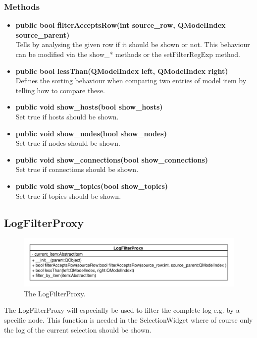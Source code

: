 \subsubsection{Methods}
\begin{itemize}
  \item \textbf{public bool filterAcceptsRow(int source\_row, QModelIndex
  source\_parent)}\\
  Tells by analysing the given row if it should be shown or not. This behaviour can be modified via the show\_* methods or the setFilterRegExp method.
  \item \textbf{public bool lessThan(QModelIndex left, QModelIndex right)}\\
  Defines the sorting behaviour when comparing two entries of model item by telling how to compare these.
  \item \textbf{public void show\_hosts(bool show\_hosts)}\\
  Set true if hosts should be shown.
  \item \textbf{public void show\_nodes(bool show\_nodes)}\\
  Set true if nodes should be shown.
  \item \textbf{public void show\_connections(bool show\_connections)}\\
  Set true if connections should be shown.
  \item \textbf{public void show\_topics(bool show\_topics)}\\
  Set true if topics should be shown.
\end{itemize}

\subsection{LogFilterProxy}
\begin{figure}[htbp]
	\begin{minipage}[t]{7cm}
		\vspace{0pt}
		\centering
		\includegraphics[scale=0.6]{./diagram_pictures/LogFilter.pdf}
		\caption{The LogFilterProxy.}
	\end{minipage}	
\end{figure} 
The LogFilterProxy will especially be used to filter the complete log e.g. by a
specific node. This function is needed in the SelectionWidget where of course
only the log of the current selection should be shown.
